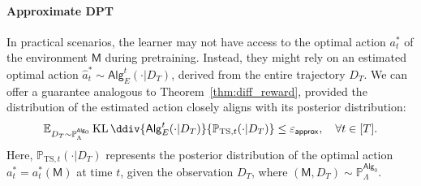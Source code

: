 \documentclass[10pt]{article}
\newcommand{\eps}{\varepsilon}
\newcommand{\KL}{\operatorname{KL}\ddiv}
\newcommand{\<}{\left\langle}
\renewcommand{\>}{\right\rangle}
\newcommand{\E}{\mathbb{E}}
\renewcommand{\P}{\mathbb{P}}
\newcommand{\inst}{{\mathsf{M}}}
\newcommand{\TS}{{\mathrm{TS}}}
\newcommand{\action}{{a}}
\newcommand{\totlen}{{T}} %
\newcommand{\sAlg}{{\mathsf{Alg}}}
\newcommand{\dset}{{D}}
\newcommand{\appeps}{\eps_{{\mathsf{approx}}}}
\newcommand{\prior}{{\Lambda}}
\newcommand{\shortexp}{{E}}
\newcommand{\authnote}[2]{{\scriptsize $\ll$\textsf{#1 notes: #2}$\gg$}}
\newcommand{\authnote}[2]{}
\newcommand{\lc}[1]{{\color{blue}\authnote{Licong}{#1}}}
\begin{document}
\paragraph{Approximate DPT} In practical scenarios, the learner may not have access to the optimal action $\action^*_t$ of the environment $\inst$ during pretraining. Instead, they might rely on an estimated optimal action $\widehat\action_t^* \sim \sAlg_{\shortexp}^t(\cdot | \dset_\totlen)$, derived from the entire trajectory $\dset_\totlen$. We can offer a guarantee analogous to Theorem~\ref{thm:diff_reward}, provided the distribution of the estimated action closely aligns with its posterior distribution: 
\begin{align}\E_{\dset_\totlen\sim\P_{\prior}^{\sAlg_0}}\KL{\sAlg_{\shortexp}^t(\cdot | \dset_\totlen)}{\P_{\TS,t}(\cdot|\dset_\totlen)}\leq\appeps,~~~ \forall t \in [\totlen]. 
\label{eq:app_opt_cond}
\end{align}
Here, $\P_{\TS,t}(\cdot|\dset_\totlen)$ represents the posterior distribution of the optimal action $\action^*_t=\action^*_t(\inst)$ at time $t$, given the observation $\dset_\totlen$, where $(\inst, \dset_\totlen) \sim \P_\prior^{\sAlg_0}$. 

\end{document}
